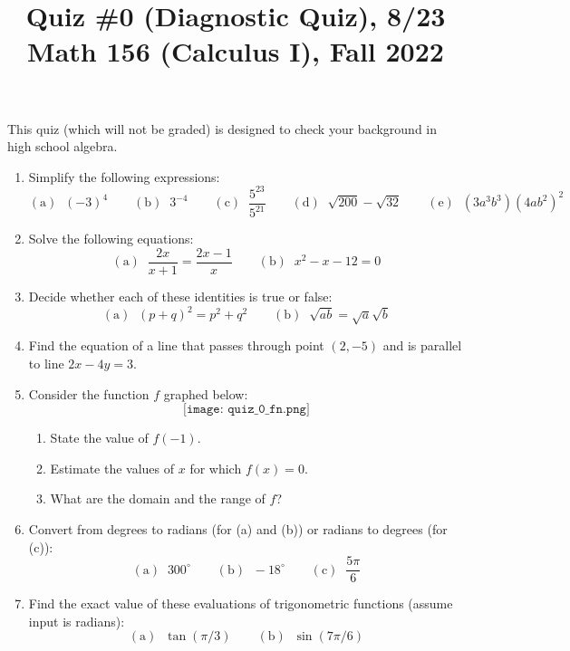 \documentclass[11pt]{article}
\title{Quiz \#0 (Diagnostic Quiz), 8/23 \\ Math 156 (Calculus I), Fall 2022}
\date{}
\begin{document}
\maketitle

\thispagestyle{empty}

\vspace{-1cm}

This quiz (which will not be graded) is designed to check your background in high school algebra.

\begin{enumerate}
\item Simplify the following expressions:
\[ \mathrm{(a)} \; \; (-3)^4 \qquad \mathrm{(b)} \; \; 3^{-4} \qquad \mathrm{(c)} \; \; \frac{5^{23}}{5^{21}} \qquad \mathrm{(d)} \; \; \sqrt{200}-\sqrt{32} \qquad \mathrm{(e)} \; \; (3a^3b^3)(4ab^2)^2 \]
\item Solve the following equations:
\[ \mathrm{(a)} \; \; \frac{2x}{x+1} = \frac{2x-1}{x} \qquad \mathrm{(b)} \; \; x^2 - x -12 = 0\]
\item Decide whether each of these identities is true or false:
\[ \mathrm{(a)} \; \; (p+q)^2 = p^2 + q^2 \qquad \mathrm{(b)} \; \; \sqrt{ab} = \sqrt{a}\sqrt{b}  \]
\item Find the equation of a line that passes through point $(2,-5)$ and is parallel to line $2x-4y=3$.

\item Consider the function $f$ graphed below:
\[ \texttt{[image: quiz\_0\_fn.png]} \]
\begin{enumerate}
\item State the value of $f(-1)$.
\item Estimate the values of $x$ for which $f(x)=0$.
\item What are the domain and the range of $f$?
\end{enumerate}

\item Convert from degrees to radians (for (a) and (b)) or radians to degrees (for (c)):
\[ \mathrm{(a)} \; \; 300^{\circ} \qquad \mathrm{(b)} \; \; -18^{\circ} \qquad \mathrm{(c)} \; \; \frac{5\pi}{6}\]

\item Find the exact value of these evaluations of trigonometric functions (assume input is radians):
\[ \mathrm{(a)} \; \; \tan(\pi/3) \qquad \mathrm{(b)} \; \; \sin(7\pi/6)\]

\end{enumerate}
\end{document}
